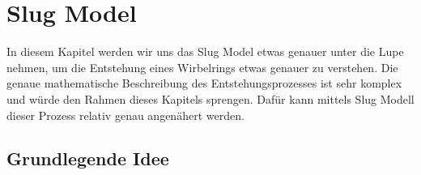 \section{Slug Model}
In diesem Kapitel werden wir uns das Slug Model etwas genauer unter die Lupe nehmen, um die Entstehung eines Wirbelrings etwas genauer zu verstehen.
Die genaue mathematische Beschreibung des Entstehungsprozesses ist sehr komplex und würde den Rahmen dieses Kapitels sprengen.
Dafür kann mittels Slug Modell dieser Prozess relativ genau angenähert werden.

\subsection{Grundlegende Idee}